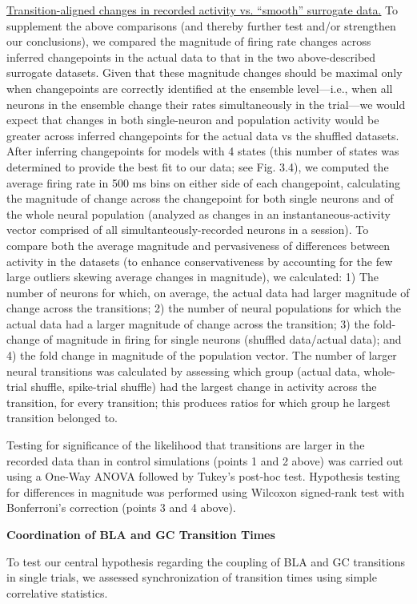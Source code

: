 \begin{refsection}
\noindent\underline{Transition-aligned changes in recorded activity vs. “smooth” surrogate data.} To supplement the above comparisons (and thereby further test and/or strengthen our conclusions), we compared the magnitude of firing rate changes across inferred changepoints in the actual data to that in the two above-described surrogate datasets. Given that these magnitude changes should be maximal only when changepoints are correctly identified at the ensemble level—i.e., when all neurons in the ensemble change their rates simultaneously in the trial—we would expect that changes in both single-neuron and population activity would be greater across inferred changepoints for the actual data vs the shuffled datasets. After inferring changepoints for models with 4 states (this number of states was determined to provide the best fit to our data; see Fig. 3.4), we computed the average firing rate in 500 ms bins on either side of each changepoint, calculating the magnitude of change across the changepoint for both single neurons and of the whole neural population (analyzed as changes in an instantaneous-activity vector comprised of all simultanteously-recorded neurons in a session). To compare both the average magnitude and pervasiveness of differences between activity in the datasets (to enhance conservativeness by accounting for the few large outliers skewing average changes in magnitude), we calculated: 1) The number of neurons for which, on average, the actual data had larger magnitude of change across the transitions; 2) the number of neural populations for which the actual data had a larger magnitude of change across the transition; 3) the fold-change of magnitude in firing for single neurons (shuffled data/actual data); and 4) the fold change in magnitude of the population vector. The number of larger neural transitions was calculated by assessing which group (actual data, whole-trial shuffle, spike-trial shuffle) had the largest change in activity across the transition, for every transition; this produces ratios for which group he largest transition belonged to.

Testing for significance of the likelihood that transitions  are larger in the recorded data than in control simulations (points 1 and 2 above) was carried out using a One-Way ANOVA followed by Tukey’s post-hoc test. Hypothesis testing for differences in magnitude was performed using Wilcoxon signed-rank test with Bonferroni’s correction (points 3 and 4 above). 

\smallskip
\noindent\textbf{Coordination of BLA and GC Transition Times}\par
\noindent To test our central hypothesis regarding the coupling of BLA and GC transitions in single trials, we assessed synchronization of transition times using simple correlative statistics.


\end{refsection}
